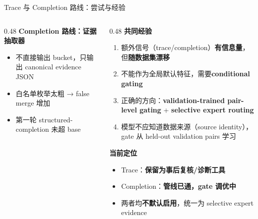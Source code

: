 \documentclass[aspectratio=169,UTF8]{ctexbeamer}
\newcommand{\key}[1]{\textcolor{ICCADBlue}{\textbf{#1}}}
\newcommand{\warn}[1]{\textcolor{ICCADOrange}{\textbf{#1}}}
\newcommand{\bad}[1]{\textcolor{ICCADRed}{\textbf{#1}}}
\begin{document}
\begin{frame}{Trace 与 Completion 路线：尝试与经验}
\begin{columns}[T]
\begin{column}{0.48\textwidth}
      \vspace{2mm}
      \textbf{Completion 路线：证据抽取器}
      \begin{itemize}
        \item 不直接输出 bucket，只输出 canonical evidence JSON
        \item 白名单枚举太粗 → false merge 增加
        \item 第一轮 structured-completion 未超 base
      \end{itemize}
    \end{column}
    \begin{column}{0.48\textwidth}
      \textbf{共同经验}
      \begin{enumerate}
        \item 额外信号（trace/completion）\key{有信息量}，但\bad{随数据集漂移}
        \item 不能作为全局默认特征，需要\key{conditional gating}
        \item 正确的方向：\key{validation-trained pair-level gating} + \key{selective expert routing}
        \item 模型不应知道数据来源（source identity），gate 从 held-out validation pairs 学习
      \end{enumerate}
      \vspace{2mm}
      \textbf{当前定位}
      \begin{itemize}
        \item Trace：\warn{保留为事后复核/诊断工具}
        \item Completion：\warn{管线已通，gate 调优中}
        \item 两者均\bad{不默认启用}，统一为 selective expert evidence
      \end{itemize}
    \end{column}
  \end{columns}
\end{frame}
\end{document}
